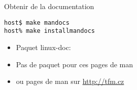 

\begin{frame}[fragile=singleslide]{Obtenir de la documentation}
  \begin{lstlisting}
host$ make mandocs
host% make installmandocs
  \end{lstlisting}  %
  \begin{itemize}
    \item Paquet linux-doc: 
    \item Pas de paquet pour ces pages de man 
    \item ou pages de man sur \url{http://tfm.cz}
  \end{itemize}
\end{frame}




